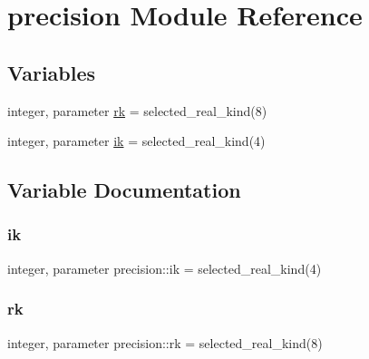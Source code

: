 \hypertarget{namespaceprecision}{}\section{precision Module Reference}
\label{namespaceprecision}
\subsection*{Variables}
\begin{DoxyCompactItemize}
\item 
integer, parameter \hyperlink{namespaceprecision_a5baca5394ac04d2c475123ef13c0e9cb}{rk} = selected\+\_\+real\+\_\+kind(8)
\item 
integer, parameter \hyperlink{namespaceprecision_a83936b6a5d1f3660620c38a2ad74f532}{ik} = selected\+\_\+real\+\_\+kind(4)
\end{DoxyCompactItemize}


\subsection{Variable Documentation}
\mbox{\label{namespaceprecision_a83936b6a5d1f3660620c38a2ad74f532}} 
\subsubsection{\texorpdfstring{ik}{ik}}
{\footnotesize\ttfamily integer, parameter precision\+::ik = selected\+\_\+real\+\_\+kind(4)}

\mbox{\label{namespaceprecision_a5baca5394ac04d2c475123ef13c0e9cb}} 
\subsubsection{\texorpdfstring{rk}{rk}}
{\footnotesize\ttfamily integer, parameter precision\+::rk = selected\+\_\+real\+\_\+kind(8)}

